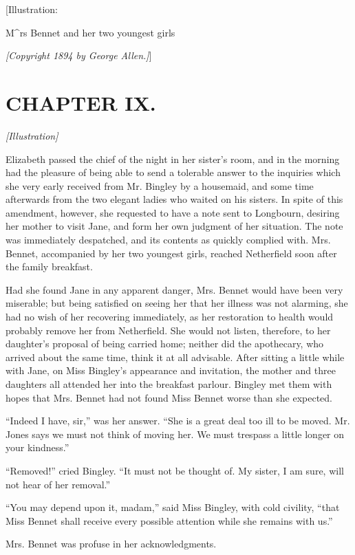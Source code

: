 \documentclass[12pt]{book}
\begin{document}
[Illustration:

M^{rs} Bennet and her two youngest girls

\emph{[\textit{Copyright 1894 by George Allen.}]}]

\chapter{CHAPTER IX.}

\emph{[Illustration]}

Elizabeth passed the chief of the night in her sister's room, and in the morning had the pleasure of being able to send a tolerable answer to the inquiries which she very early received from Mr. Bingley by a housemaid, and some time afterwards from the two elegant ladies who waited on his sisters. In spite of this amendment, however, she requested to have a note sent to Longbourn, desiring her mother to visit Jane, and form her own judgment of her situation. The note was immediately despatched, and its contents as quickly complied with. Mrs. Bennet, accompanied by her two youngest girls, reached Netherfield soon after the family breakfast.

Had she found Jane in any apparent danger, Mrs. Bennet would have been very miserable; but being satisfied on seeing her that her illness was not alarming, she had no wish of her recovering immediately, as her restoration to health would probably remove her from Netherfield. She would not listen, therefore, to her daughter's proposal of being carried home; neither did the apothecary, who arrived about the same time, think it at all advisable. After sitting a little while with Jane, on Miss Bingley's appearance and invitation, the mother and three daughters all attended her into the breakfast parlour. Bingley met them with hopes that Mrs. Bennet had not found Miss Bennet worse than she expected.

``Indeed I have, sir,'' was her answer. ``She is a great deal too ill to be moved. Mr. Jones says we must not think of moving her. We must trespass a little longer on your kindness.''

``Removed!'' cried Bingley. ``It must not be thought of. My sister, I am sure, will not hear of her removal.''

``You may depend upon it, madam,'' said Miss Bingley, with cold civility, ``that Miss Bennet shall receive every possible attention while she remains with us.''

Mrs. Bennet was profuse in her acknowledgments.
\end{document}
